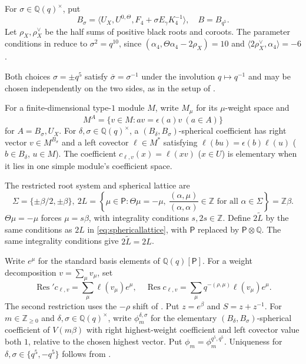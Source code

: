 \documentclass[12pt,reqno]{amsart}
\theoremstyle{plain}
\theoremstyle{definition}
\numberwithin{equation}{section}
\newcommand{\kk}{\mathbb Q(q)}
\newcommand{\Res}{\operatorname{Res}}
\newcommand{\eps}{\epsilon}
\begin{document}
For $\sigma\in\kk^\times$, put
\[
B_\sigma
=\langle U_X,U^{0,\Theta},F_4+\sigma E_\gamma K_4^{-1}\rangle,
\quad B=B_{q^5}.
\]
Let $\rho_X,\rho_X^\vee$ be the half sums of positive black roots
and coroots. The parameter conditions in
\cite[Definition~2.4]{Sch26} reduce to $\sigma^2=q^{10}$, since $(\alpha_4,\Theta\alpha_4-2\rho_X)=10$ and $\langle2\rho_X^\vee,\alpha_4\rangle=-6$.

Both choices $\sigma=\pm q^5$ satisfy
$\overline{\sigma}=\sigma^{-1}$ under the involution
$q\mapsto q^{-1}$ and may be chosen independently on the two
sides, as in the setup of \cite[Definition~2.8]{Sch26}.

For a finite-dimensional type-$1$ module $M$, write $M_\mu$ for
its $\mu$-weight space and
\[
M^A=\{v\in M:av=\eps(a)v\ (a\in A)\}
\]
for $A=B_\sigma,U_X$.
For $\delta,\sigma\in\kk^\times$, a
$(B_\delta,B_\sigma)$-spherical coefficient has right vector
$v\in M^{B_\sigma}$ and a left covector $\ell\in M^*$ satisfying
$\ell(bu)=\eps(b)\ell(u)$ ($b\in B_\delta$, $u\in M$).
The coefficient $c_{\ell,v}(x)=\ell(xv)$ ($x\in U$) is elementary
when it lies in one simple module's coefficient space.

The restricted root system and spherical lattice are
\begin{equation}\label{eq:sphericallattice}
		\Sigma=\{\pm\beta/2,\pm\beta\},\ 
		2L=\left\{\mu\in\mathsf P:\Theta\mu=-\mu,\ 
		\frac{(\alpha,\mu)}{(\alpha,\alpha)}\in\mathbb Z
		\text{ for all }\alpha\in\Sigma\right\}
		=\mathbb Z\beta.
\end{equation}
$\Theta\mu=-\mu$ forces $\mu=s\beta$, with integrality
conditions $s,2s\in\mathbb Z$.
Define $2\widetilde L$ by the same conditions as $2L$ in
\eqref{eq:sphericallattice}, with $\mathsf P$ replaced by
$\mathsf P\otimes\mathbb Q$.
The same integrality conditions give $2\widetilde L=2L$.

Write $e^\mu$ for the standard basis elements of $\kk[\mathsf P]$.
For a weight decomposition $v=\sum_\mu v_\mu$, set
\begin{equation}\label{eq:restriction}
	\Res'c_{\ell,v}=\sum_\mu\ell(v_\mu)e^\mu,\quad
	\Res c_{\ell,v}=\sum_\mu q^{-(\rho,\mu)}\ell(v_\mu)e^\mu.
\end{equation}
The second restriction uses the $-\rho$ shift of
\cite[Definition~2.12]{Sch26}.
Put $z=e^\beta$ and $S=z+z^{-1}$.
For $m\in\mathbb Z_{\ge0}$ and $\delta,\sigma\in\kk^\times$,
write $\phi_m^{\delta,\sigma}$ for the elementary
$(B_\delta,B_\sigma)$-spherical coefficient of $V(m\beta)$ with
right highest-weight coefficient and left covector value both $1$,
relative to the chosen highest vector. Put
$\phi_m=\phi_m^{q^5,q^5}$.
Uniqueness for $\delta,\sigma\in\{q^5,-q^5\}$ follows from
\cite[Lemma~4.2]{Mee26}.
\end{document}
